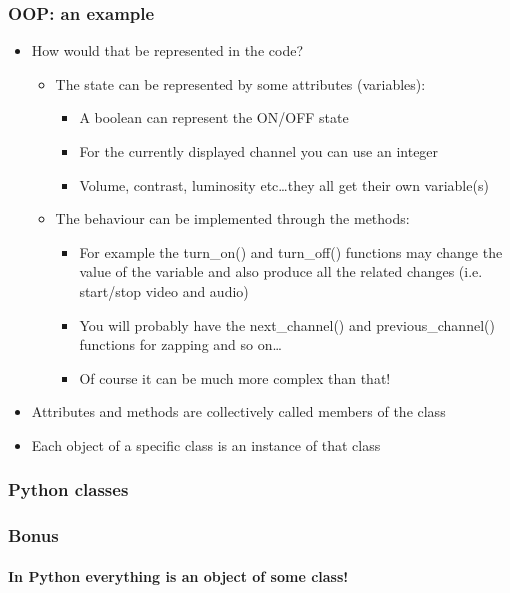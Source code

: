 \documentclass[9pt]{beamer}
\begin{document}
\begin{frame}
  \frametitle{OOP: an example}

  \begin{itemize}
    \item How would that be represented in the code?
    \smallskip
      \begin{itemize}
      \item The state can be represented by some \alert{attributes} (variables):
      \begin{itemize}
        \item A boolean can represent the ON/OFF state
        \item For the currently displayed channel you can use an integer
        \item Volume, contrast, luminosity etc\dots they all get their own variable(s)
      \end{itemize}

      \medskip

      \item The behaviour can be implemented through the \alert{methods}:
      \smallskip
      \begin{itemize}
        \item For example the turn\_on() and turn\_off() functions may change the value of the variable
              and also produce all the related changes (i.e. start/stop video and audio)
        \item You will probably have the next\_channel() and previous\_channel() functions for zapping and so on\dots
        \item Of course it can be much more complex than that!
      \end{itemize}
    \end{itemize}

    \medskip

    \item Attributes and methods are collectively called \alert{members} of the class
    \medskip
    \item Each object of a specific class is an \alert{instance} of that class
  \end{itemize}

\end{frame}


\begin{frame}
  \frametitle{Python classes}
  
\end{frame}


\begin{frame}
  \frametitle{Bonus}
  \framesubtitle{In Python everything is an object of some class!}
  
\end{frame}
\end{document}

